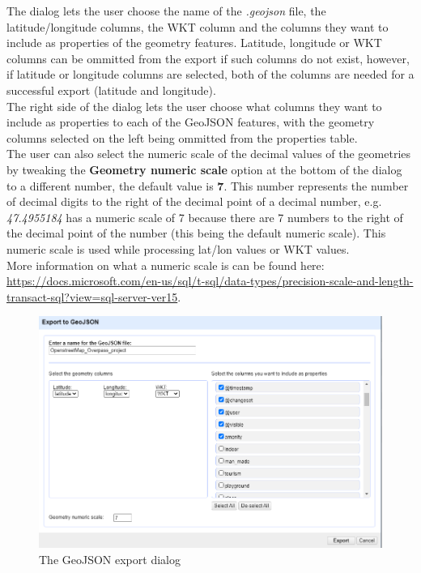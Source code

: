 The dialog lets the user choose the name of the \textit{.geojson} file, the latitude/longitude columns, the WKT column
and the columns they want to include as properties of the geometry features. Latitude, longitude or WKT columns can be
ommitted from the export if such columns do not exist, however, if latitude or longitude columns are selected,
both of the columns are needed for a successful export (latitude and longitude).\\
\newline
The right side of the dialog lets the user choose what columns they want to include as properties to each of the GeoJSON features,
with the geometry columns selected on the left being ommitted from the properties table.\\
\newline
The user can also select the numeric scale of the decimal values of the geometries by tweaking the \textbf{Geometry numeric scale}
option at the bottom of the dialog to a different number, the default value is \textbf{7}. This number represents the
number of decimal digits to the right  of the decimal point of a decimal number, e.g. \textit{47.4955184} has a numeric scale of
7 because there are 7 numbers to the right of the decimal point of the number (this being the default numeric scale).
This numeric scale is used while processing lat/lon values or WKT values. \\
\newline
More information on what a numeric scale is can be found here:
\href{https://docs.microsoft.com/en-us/sql/t-sql/data-types/precision-scale-and-length-transact-sql?view=sql-server-ver15}{https://docs.microsoft.com/en-us/sql/t-sql/data-types/precision-scale-and-length-transact-sql?view=sql-server-ver15}.

\begin{figure}[H]
    \includegraphics[width=\linewidth]{./Figures/GeoJSON_Export/geojson_export_dialog}
    \caption{The GeoJSON export dialog}
\end{figure}


